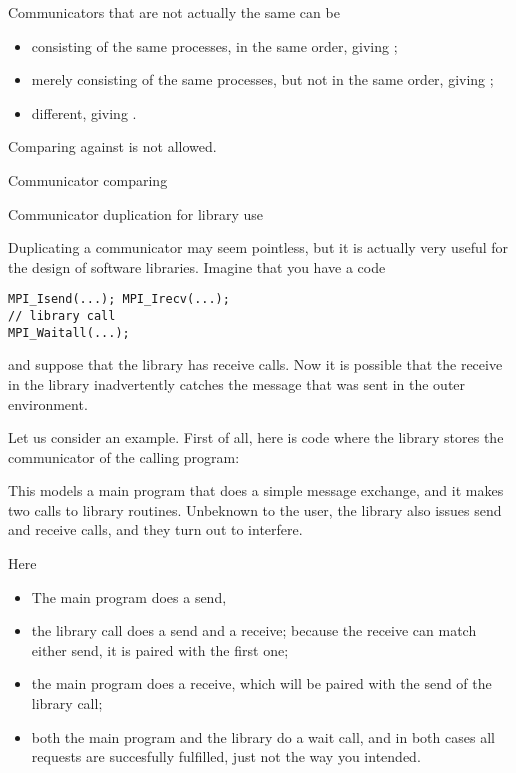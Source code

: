 Communicators that are not actually the same can be
\begin{itemize}
\item consisting of the same processes, in the same order,
  giving ;
\item merely consisting of the same processes, but not in the same order,
  giving ;
\item different, giving .
\end{itemize}

Comparing against  is not allowed.

\begin{mplnote}{Communicator comparing}
\end{mplnote}

 {Communicator duplication for library use}
\label{sec:mpi-comm-dup-lib}

Duplicating a communicator may seem pointless, but it is actually very useful for the design of
software libraries. Imagine that you have a code
\lstset{style=reviewcode,language=C}
\begin{lstlisting}
MPI_Isend(...); MPI_Irecv(...);
// library call
MPI_Waitall(...);
\end{lstlisting}
and suppose that the library has receive calls. Now it is possible that the 
receive in the library inadvertently
catches the message that was sent in the outer environment.

Let us consider an example.
First of all, here is code where the library stores the communicator
of the calling program:
%

This models a main program that does a simple message exchange, and it
makes two calls to library routines. Unbeknown to the user, the
library also issues send and receive calls, and they turn out to
interfere.

Here
\begin{itemize}
\item The main program does a send,
\item the library call  does a send and a receive;
  because the receive can match either send, it is paired with the
  first one;
\item the main program does a receive, which will be paired with the send of the 
  library call;
\item both the main program and the library do a wait call, and in
  both cases all requests are succesfully fulfilled, just not the way
  you intended.
\end{itemize}

